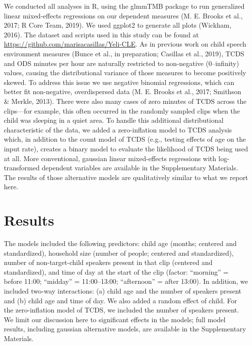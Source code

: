 \documentclass[,man,floatsintext]{apa6}
\begin{document}
We conducted all analyses in R, using the glmmTMB package to run
generalized linear mixed-effects regressions on our dependent measures
(M. E. Brooks et al., 2017; R Core Team, 2019). We used ggplot2 to
generate all plots (Wickham, 2016). The dataset and scripts used in this
study can be found at \url{https://github.com/marisacasillas/Yeli-CLE}.
As in previous work on child speech environment measures (Bunce et al.,
in preparation; Casillas et al., 2019), TCDS and ODS minutes per hour
are naturally restricted to non-negative (0--infinity) values, causing
the distributional variance of those measures to become positively
skewed. To address this issue we use negative binomial regressions,
which can better fit non-negative, overdispersed data (M. E. Brooks et
al., 2017; Smithson \& Merkle, 2013). There were also many cases of zero
minutes of TCDS across the clips---for example, this often occurred in
the randomly sampled clips when the child was sleeping in a quiet area.
To handle this additional distributional characteristic of the data, we
added a zero-inflation model to TCDS analysis which, in addition to the
count model of TCDS (e.g., testing effects of age on the input rate),
creates a binary model to evaluate the likelihood of TCDS being used at
all. More conventional, gaussian linear mixed-effects regressions with
log-transformed dependent variables are available in the Supplementary
Materials. The results of those alternative models are qualitatively
similar to what we report here.

\section{Results}\label{results}

The models included the following predictors: child age (months;
centered and standardized), household size (number of people; centered
and standardized), number of non-target-child speakers present in that
clip (centered and standardized), and time of day at the start of the
clip (factor: \enquote{morning} = before 11:00; \enquote{midday} =
11:00--13:00; \enquote{afternoon} = after 13:00). In addition, we
included two-way interactions: (a) child age and the number of speakers
present and (b) child age and time of day. We also added a random effect
of child. For the zero-inflation model of TCDS, we included the number
of speakers present. We limit our discussion here to significant effects
in the models; full model results, including gaussian alternative
models, are available in the Supplementary Materials.
\end{document}
